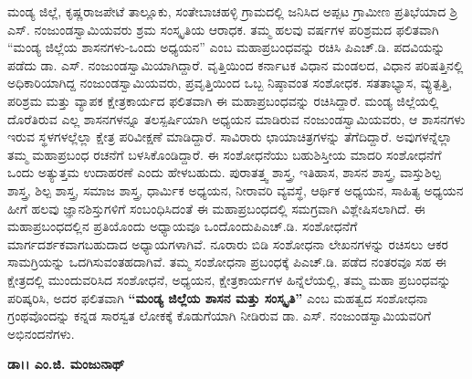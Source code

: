 ಮಂಡ್ಯ ಜಿಲ್ಲೆ, ಕೃಷ್ಣರಾಜಪೇಟೆ ತಾಲ್ಲೂಕು, ಸಂತೇಬಾಚಹಳ್ಳಿ ಗ್ರಾಮದಲ್ಲಿ ಜನಿಸಿದ ಅಪ್ಪಟ ಗ್ರಾಮೀಣ ಪ್ರತಿಭೆಯಾದ ಶ್ರಿ ಎಸ್​. ನಂಜುಂಡಸ್ವಾಮಿಯವರು ಶ್ರಮ ಸಂಸ್ಕೃತಿಯ ಆರಾಧಕ.   ತಮ್ಮ ಹಲವು ವರ್ಷಗಳ ಪರಿಶ್ರಮದ ಫಲಿತವಾಗಿ “ಮಂಡ್ಯ ಜಿಲ್ಲೆಯ ಶಾಸನಗಳು-ಒಂದು ಅಧ್ಯಯನ” ಎಂಬ ಮಹಾಪ್ರಬಂಧವನ್ನು ರಚಿಸಿ ಪಿಎಚ್​.ಡಿ. ಪದವಿಯನ್ನು ಪಡೆದು ಡಾ. ಎಸ್​. ನಂಜುಂಡಸ್ವಾಮಿಯಾಗಿದ್ದಾರೆ. ವೃತ್ತಿಯಿಂದ ಕರ್ನಾಟಕ ವಿಧಾನ ಮಂಡಲದ, ವಿಧಾನ ಪರಿಷತ್ತಿನಲ್ಲಿ ಅಧಿಕಾರಿಯಾಗಿದ್ದ ನಂಜುಂಡಸ್ವಾಮಿಯವರು, ಪ್ರವೃತ್ತಿಯಿಂದ ಒಬ್ಬ ನಿಷ್ಠಾವಂತ ಸಂಶೋಧಕ. ಸತತಾಭ್ಯಾಸ, ವ್ಯುತ್ಪತ್ತಿ, ಪರಿಶ್ರಮ ಮತ್ತು  ವ್ಯಾಪಕ ಕ್ಷೇತ್ರಕಾರ್ಯದ ಫಲಿತವಾಗಿ ಈ ಮಹಾಪ್ರಬಂಧವನ್ನು ರಚಿಸಿದ್ದಾರೆ. ಮಂಡ್ಯ ಜಿಲ್ಲೆಯಲ್ಲಿ ದೊರೆತಿರುವ ಎಲ್ಲ ಶಾಸನಗಳನ್ನೂ ತಲಸ್ಪರ್ಷಿಯಾಗಿ ಅಧ್ಯಯನ ಮಾಡಿರುವ ನಂಜುಂಡಸ್ವಾಮಿಯವರು, ಆ ಶಾಸನಗಳು ಇರುವ ಸ್ಥಳಗಳ\-ಲ್ಲೆಲ್ಲಾ ಕ್ಷೇತ್ರ ಪರಿವೀಕ್ಷಣೆ ಮಾಡಿದ್ದಾರೆ. ಸಾವಿರಾರು ಛಾಯಾಚಿತ್ರಗಳನ್ನು ತೆಗೆದಿದ್ದಾರೆ. ಅವುಗಳನ್ನೆಲ್ಲಾ ತಮ್ಮ ಮಹಾಪ್ರಬಂಧ ರಚನೆಗೆ ಬಳಸಿಕೊಂಡಿದ್ದಾರೆ.  ಈ ಸಂಶೋಧನೆಯು ಬಹುಶಿಸ್ತೀಯ ಮಾದರಿ ಸಂಶೋಧನೆಗೆ ಒಂದು ಅತ್ಯುತ್ತಮ ಉದಾಹರಣೆ ಎಂದು ಹೇಳಬಹುದು. ಪುರಾತತ್ತ್ವ ಶಾಸ್ತ್ರ, ಇತಿಹಾಸ, ಶಾಸನ ಶಾಸ್ತ್ರ, ವಾಸ್ತುಶಿಲ್ಪ ಶಾಸ್ತ್ರ, ಶಿಲ್ಪ ಶಾಸ್ತ್ರ, ಸಮಾಜ ಶಾಸ್ತ್ರ,  ಧಾರ್ಮಿಕ ಅಧ್ಯಯನ, ನೀರಾವರಿ ವ್ಯವಸ್ಥೆ, ಆರ್ಥಿಕ ಅಧ್ಯಯನ, ಸಾಹಿತ್ಯ ಅಧ್ಯಯನ ಹೀಗೆ ಹಲವು ಜ್ಞಾನಶಿಸ್ತುಗಳಿಗೆ ಸಂಬಂಧಿಸಿದಂತೆ ಈ ಮಹಾಪ್ರಬಂಧದಲ್ಲಿ ಸಮಗ್ರವಾಗಿ ವಿಶ್ಲೇಷಿಸಲಾಗಿದೆ. ಈ ಮಹಾಪ್ರಬಂಧದಲ್ಲಿನ ಪ್ರತಿಯೊಂದು ಅಧ್ಯಾಯವೂ ಒಂದೊಂದು\break ಪಿಎಚ್​.ಡಿ. ಸಂಶೋಧನೆಗೆ ಮಾರ್ಗದರ್ಶಕವಾಗಬಹುದಾದ ಅಧ್ಯಾಯಗಳಾಗಿವೆ. ನೂರಾರು ಬಿಡಿ ಸಂಶೋಧನಾ ಲೇಖನಗಳನ್ನು ರಚಿಸಲು ಆಕರ ಸಾಮಗ್ರಿಯನ್ನು ಒದಗಿಸುವಂತಹದಾಗಿವೆ. ತಮ್ಮ ಸಂಶೋಧನಾ ಪ್ರಬಂಧಕ್ಕೆ ಪಿಎಚ್​.ಡಿ. ಪಡೆದ ನಂತರವೂ ಸಹ ಈ ಕ್ಷೇತ್ರದಲ್ಲಿ ಮುಂದುವರಿಸಿದ ಸಂಶೋಧನೆ, ಅಧ್ಯಯನ, ಕ್ಷೇತ್ರಕಾರ್ಯಗಳ ಹಿನ್ನೆಲೆಯಲ್ಲಿ, ತಮ್ಮ ಮಹಾ ಪ್ರಬಂಧವನ್ನು ಪರಿಷ್ಕರಿಸಿ, ಅದರ ಫಲಿತವಾಗಿ \textbf{“ಮಂಡ್ಯ ಜಿಲ್ಲೆಯ ಶಾಸನ ಮತ್ತು ಸಂಸ್ಕೃತಿ”} ಎಂಬ ಮಹತ್ವದ ಸಂಶೋಧನಾ ಗ್ರಂಥ\-ವೊಂದನ್ನು ಕನ್ನಡ ಸಾರಸ್ವತ ಲೋಕಕ್ಕೆ ಕೊಡುಗೆಯಾಗಿ ನೀಡಿರುವ ಡಾ. ಎಸ್​. ನಂಜುಂಡಸ್ವಾಮಿಯವರಿಗೆ ಅಭಿನಂದನೆಗಳು.


\medskip
\bigskip

\noindent
\hfill \textbf{ಡಾ।। ಎಂ.ಜಿ. ಮಂಜುನಾಥ್}

